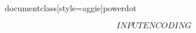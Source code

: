 documentclass[style=aggie]{powerdot}

$$INPUTENCODING$$

\pdsetup{
}

\title{}
\author{$$AUTHOR$$}
\date{}


\maketitle

\section{}

\begin{slide}{}
\end{slide}


